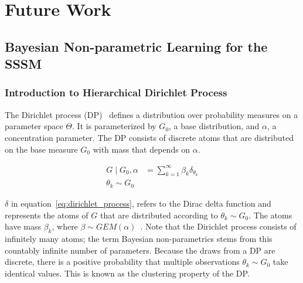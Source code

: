 \section{Future Work}
\subsection{Bayesian Non-parametric Learning for the SSSM}\label{sec:non-parameteric}
\subsubsection{Introduction to Hierarchical Dirichlet Process}
The Dirichlet process (DP)~\citep{ferguson1973bayesian} defines a distribution over probability measures on a parameter space $\Theta$. It is parameterized by $G_0$, a base distribution, and $\alpha$, a concentration parameter. The DP consists of discrete atoms that are distributed on the base measure $G_0$ with mass that depends on $\alpha$.

\begin{equation}\label{eq:dirichlet_process}
  \begin{split}
    G \mid G_0, \alpha &= \sum\limits_{k=1}^{\infty} \beta_k \delta_{\theta_k} \\
    \theta_k \sim G_0
  \end{split}
\end{equation}

$\delta$ in equation~\ref{eq:dirichlet_process}, refers to the Dirac delta function and represents the atoms of $G$ that are distributed according to $\theta_k \sim G_0$. The atoms have mass $\beta_k$, where $\beta \sim GEM(\alpha)$~\citep{neal2000markov}. Note that the Dirichlet process consists of infinitely many atoms; the term Bayesian non-parametrics stems from this countably infinite number of parameters. Because the draws from a DP are discrete, there is a positive probability that multiple observations $\theta_k \sim G_0$ take identical values. This is known as the clustering property of the DP.

